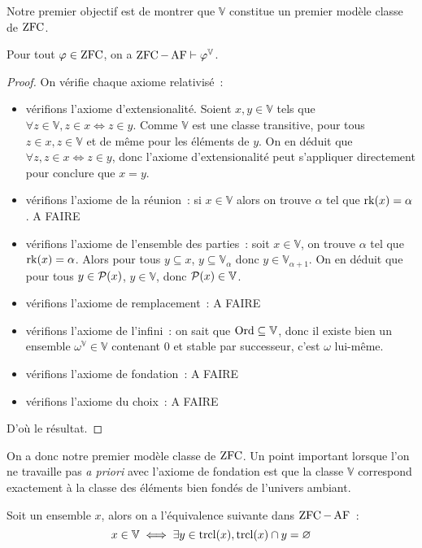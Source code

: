 Notre premier objectif est de montrer que $\mathbb V$ constitue un premier
modèle classe de $\operatorname{ZFC}$.

\begin{theorem}\label{thm.V.ZFCAF}
  Pour tout $\varphi \in \operatorname{ZFC}$, on a $\operatorname{ZFC} - \operatorname{AF} \vdash \varphi^\mathbb V$.
\end{theorem}

\begin{proof}
  On vérifie chaque axiome relativisé~:
  \begin{itemize}
  \item vérifions l'axiome d'extensionalité. Soient $x,y\in \mathbb V$ tels que
    $\forall z\in \mathbb V, z\in x\iff z \in y$. Comme $\mathbb V$ est une
    classe transitive, pour tous $z\in x, z\in \mathbb V$ et de même pour les
    éléments de $y$. On en déduit que $\forall z, z\in x \iff z \in y$, donc
    l'axiome d'extensionalité peut s'appliquer directement pour conclure que
    $x = y$.
  \item vérifions l'axiome de la réunion~: si $x\in \mathbb V$ alors on trouve
    $\alpha$ tel que $\operatorname{rk}(x) = \alpha$. A FAIRE
  \item vérifions l'axiome de l'ensemble des parties~: soit $x\in \mathbb V$,
    on trouve $\alpha$ tel que $\operatorname{rk}(x) = \alpha$. Alors pour tous
    $y\subseteq x$, $y\subseteq \mathbb V_\alpha$ donc
    $y\in\mathbb V_{\alpha +1}$. On en déduit que pour tous $y\in \mathcal{P}(x)$,
    $y\in \mathbb V$, donc $\mathcal{P}(x)\in\mathbb V$.
  \item vérifions l'axiome de remplacement~: A FAIRE
  \item vérifions l'axiome de l'infini~: on sait que $\operatorname{Ord}\subseteq\mathbb V$,
    donc il existe bien un ensemble $\omega^\mathbb V \in \mathbb V$
    contenant $0$ et stable par successeur, c'est $\omega$ lui-même.
  \item vérifions l'axiome de fondation~: A FAIRE
  \item vérifions l'axiome du choix~: A FAIRE
  \end{itemize}
  D'où le résultat.
\end{proof}

On a donc notre premier modèle classe de $\operatorname{ZFC}$. Un point important lorsque l'on
ne travaille pas \emph{a priori} avec l'axiome de fondation est que la classe
$\mathbb V$ correspond exactement à la classe des éléments bien fondés de
l'univers ambiant.

\begin{proposition}
  Soit un ensemble $x$, alors on a l'équivalence suivante dans $\operatorname{ZFC}-\operatorname{AF}$~:
  \[x\in \mathbb V \iff \exists y \in \operatorname{trcl}(x), \operatorname{trcl}(x) \cap y = \varnothing\]
\end{proposition}

